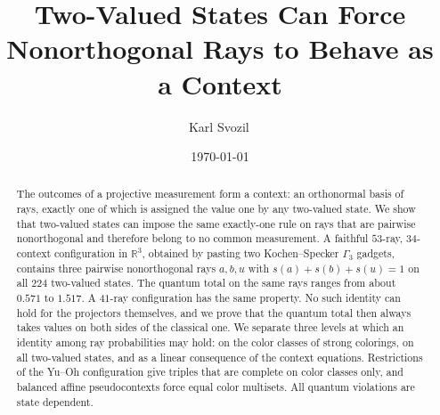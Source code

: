 \documentclass[aps,pra,reprint,superscriptaddress,longbibliography,nofootinbib,floatfix,10pt]{revtex4-2}
\theoremstyle{definition}\newtheorem{definition}[theorem]{Definition}
\theoremstyle{remark}\newtheorem{remark}[theorem]{Remark}
\begin{document}
%
%
%
\title{Two-Valued States Can Force Nonorthogonal Rays to Behave as a Context}
\author{Karl Svozil\,}
\date{\today}
\begin{abstract}
The outcomes of a projective measurement form a context: an orthonormal basis of rays, exactly one of which is assigned the value one by any two-valued state. We show that two-valued states can impose the same exactly-one rule on rays that are pairwise nonorthogonal and therefore belong to no common measurement. A faithful $53$-ray, $34$-context configuration in $\mathbb R^3$, obtained by pasting two Kochen--Specker $\Gamma_3$ gadgets, contains three pairwise nonorthogonal rays $a,b,u$ with $s(a)+s(b)+s(u)=1$ on all $224$ two-valued states. The quantum total on the same rays ranges from about $0.571$ to $1.517$. A $41$-ray configuration has the same property. No such identity can hold for the projectors themselves, and we prove that the quantum total then always takes values on both sides of the classical one. We separate three levels at which an identity among ray probabilities may hold: on the color classes of strong colorings, on all two-valued states, and as a linear consequence of the context equations. Restrictions of the Yu--Oh configuration give triples that are complete on color classes only, and balanced affine pseudocontexts force equal color multisets. All quantum violations are state dependent.
\end{abstract}
\maketitle
\end{document}
